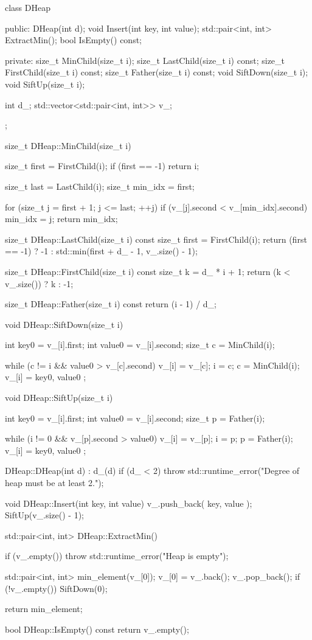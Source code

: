 class DHeap {
public:
    DHeap(int d);
    void Insert(int key, int value);
    std::pair<int, int> ExtractMin();
    bool IsEmpty() const;

private:
    size_t MinChild(size_t i);
    size_t LastChild(size_t i) const;
    size_t FirstChild(size_t i) const;
    size_t Father(size_t i) const;
    void SiftDown(size_t i);
    void SiftUp(size_t i);

    int d_;
    std::vector<std::pair<int, int>> v_;
};

size_t DHeap::MinChild(size_t i) {
    size_t first = FirstChild(i);
    if (first == -1) return i;

    size_t last = LastChild(i);
    size_t min_idx = first;

    for (size_t j = first + 1; j <= last; ++j) {
        if (v_[j].second < v_[min_idx].second) {
            min_idx = j;
        }
    }
    return min_idx;
}

size_t DHeap::LastChild(size_t i) const {
    size_t first = FirstChild(i);
    return (first == -1) ? -1 : std::min(first + d_ - 1, v_.size() - 1);
}

size_t DHeap::FirstChild(size_t i) const {
    size_t k = d_ * i + 1;
    return (k < v_.size()) ? k : -1;
}

size_t DHeap::Father(size_t i) const {
    return (i - 1) / d_;
}

void DHeap::SiftDown(size_t i) {
    int key0 = v_[i].first;
    int value0 = v_[i].second;
    size_t c = MinChild(i);

    while (c != i && value0 > v_[c].second) {
        v_[i] = v_[c];
        i = c;
        c = MinChild(i);
    }
    v_[i] = { key0, value0 };
}

void DHeap::SiftUp(size_t i) {
    int key0 = v_[i].first;
    int value0 = v_[i].second;
    size_t p = Father(i);

    while (i != 0 && v_[p].second > value0) {
        v_[i] = v_[p];
        i = p;
        p = Father(i);
    }
    v_[i] = { key0, value0 };
}

DHeap::DHeap(int d) : d_(d) {
    if (d_ < 2) throw std::runtime_error("Degree of heap must be at least 2.");
}

void DHeap::Insert(int key, int value) {
    v_.push_back({ key, value });
    SiftUp(v_.size() - 1);
}

std::pair<int, int> DHeap::ExtractMin() {
    if (v_.empty()) throw std::runtime_error("Heap is empty");

    std::pair<int, int> min_element(v_[0]);
    v_[0] = v_.back();
    v_.pop_back();
    if (!v_.empty()) SiftDown(0);

    return min_element;
}

bool DHeap::IsEmpty() const {
    return v_.empty();
}

